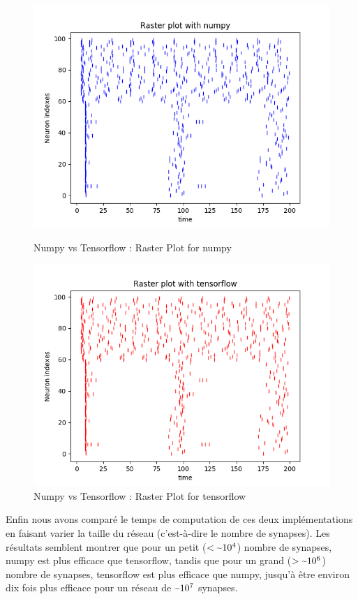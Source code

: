 \documentclass[12pt]{scrartcl}
\begin{document}
\begin{figure}[!h]
\begin{minipage}[l]{.48\linewidth}
\centering
\includegraphics[scale=0.5]{imgs/rasternp.png}
\caption{Numpy vs Tensorflow : Raster Plot for numpy}
\label{rasternp}
\end{minipage}\hfill
\begin{minipage}[l]{.48\linewidth}
\centering
\includegraphics[scale=0.5]{imgs/rastertf.png}
\caption{Numpy vs Tensorflow : Raster Plot for tensorflow}
\label{rastertf}
\end{minipage}\hfill
\end{figure}


Enfin nous avons comparé le temps de computation de ces deux implémentations en faisant varier la taille du réseau (c'est-à-dire le nombre de synapses). Les résultats semblent montrer que pour un petit ($< \raisebox{-0ex}{\textasciitilde}10^4$) nombre de synapses, numpy est plus efficace que tensorflow, tandis que pour un grand ($>\raisebox{-0ex}{\textasciitilde}10^6$) nombre de synapses, tensorflow est plus efficace que numpy, jusqu'à être environ dix fois plus efficace pour un réseau de $\raisebox{-0ex}{\textasciitilde}10^7$ synapses.
\end{document}
